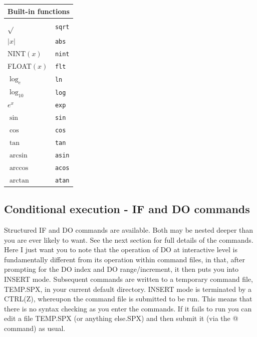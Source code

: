 \documentclass[11pt,twoside]{report}
\begin{document}
\begin{center}
\begin{tabular}{|ll|} \hline
\multicolumn{2}{|c|}{Built-in functions}\\ \hline
$\sqrt{}$   & \verb+sqrt+ \\
$|x|$       & \verb+abs+  \\
NINT$(x)$   & \verb+nint+  \\
FLOAT$(x)$  & \verb+flt+  \\
$\log_e$     & \verb+ln+   \\
$\log_{10}$  & \verb+log+  \\
$e^x$       & \verb+exp+  \\
$\sin$      & \verb+sin+  \\
$\cos$      & \verb+cos+  \\
$\tan$      & \verb+tan+  \\
$\arcsin$   & \verb+asin+  \\
$\arccos$   & \verb+acos+  \\
$\arctan$   & \verb+atan+  \\ \hline
\end{tabular}
\end{center}

\subsection{Conditional execution - IF and DO commands}

Structured IF and DO commands are available. Both may be nested
deeper
than you are ever likely to want. See the next section for full details of the
commands. Here I just want you to note that the operation of DO at
interactive level is fundamentally different from its
operation within command files, in that, after prompting for the DO index and
DO range/increment, it then puts you into INSERT mode. Subsequent commands are
written to a temporary command file, TEMP.SPX, in your current
default directory. INSERT mode is terminated by a CTRL(Z),
whereupon the command file is submitted to be run. This means that there is no
syntax checking as you enter the commands. If it fails to run you can edit a
file TEMP.SPX (or anything else.SPX) and then submit it (via the @ command) as
usual. 
\end{document}
